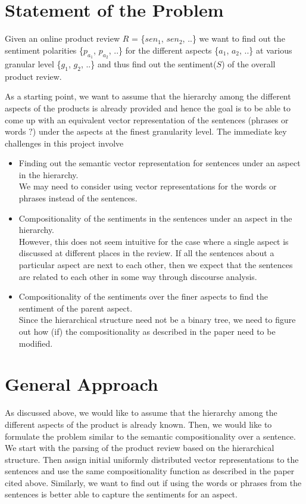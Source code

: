 \documentclass{article}
\begin{document}
\section{Statement of the Problem}
Given an online product review $R$ = \{$sen_{1}$, $sen_{2}$, ..\} we want to find out the sentiment polarities \{$p_{a_{1}}$, $p_{a_{2}}$, ..\}  for the different aspects \{$a_{1}$, $a_{2}$, ..\} at various granular level \{$g_{1}$, $g_{2}$, ..\} and thus find out the sentiment($S$) of the overall product review. 

As a starting point, we want to assume that the hierarchy among the different aspects of the products is already provided and hence the goal is to be able to come up with an equivalent vector representation of the sentences (phrases or words $?$) under the aspects at the finest granularity level. The immediate key challenges in this project involve 
\begin{itemize}
 \item Finding out the semantic vector representation for sentences under an aspect in the hierarchy.\\
 We may need to consider using vector representations for the words or phrases instead of the sentences.
 \item Compositionality of the sentiments in the sentences under an aspect in the hierarchy. \\
 However, this does not seem intuitive for the case where a single aspect is discussed at different places in the review. If all the sentences about a particular aspect are next to each other, then we expect that the sentences are related to each other in some way through discourse analysis.
 \item Compositionality of the sentiments over the finer aspects to find the sentiment of the parent aspect.\\
 Since the hierarchical structure need not be a binary tree, we need to figure out how (if) the compositionality as described in the paper \cite{Socher} need to be modified.
\end{itemize}

\section{General Approach}
As discussed above, we would like to assume that the hierarchy among the different aspects of the product is already known. Then, we would like to formulate the problem similar to the semantic compositionality over a sentence. We start with the parsing of the product review based on the hierarchical structure. Then assign initial uniformly distributed vector representations to the sentences and use the same compositionality function as described in the paper cited above. Similarly, we want to find out if using the words or phrases from the sentences is better able to capture the sentiments for an aspect.
\end{document}
